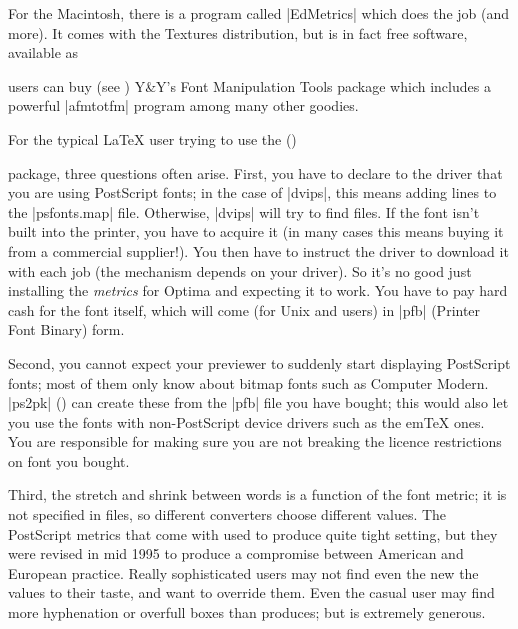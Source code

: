 For the Macintosh, there is a program called \ProgName|EdMetrics| which does
the job (and more).  It comes with the Textures distribution, but is
in fact free software, available as 

\MSDOS{} users can buy
(see )
Y\&Y's Font Manipulation Tools package which includes a powerful
\ProgName|afmtotfm| program among many other goodies.


For the typical \LaTeX{} user trying to use the
\htmlignore
{} ()
\endhtmlignore
\begin{htmlversion}
\end{htmlversion}
package, three questions often arise.
First, you have to declare to the  driver that you are using
PostScript fonts; in the case of \ProgName|dvips|, this means adding
lines to the |psfonts.map| file. Otherwise, \ProgName|dvips| will try
to find  
files. If the font isn't built into the printer, you have to acquire
it (in many cases this means buying it from a commercial supplier!).
You then have to instruct the driver to download it with each job (the
mechanism depends on your driver). So it's no
good just installing the \emph{metrics} for Optima and expecting it to
work. You have to pay hard cash for the font itself, which will come
(for Unix and \MSDOS{} users) in |pfb| (Printer Font Binary) form.

Second, you cannot expect your previewer to suddenly start displaying
PostScript fonts; most of them only know about  bitmap fonts
such as Computer Modern. \ProgName|ps2pk| () can create
these from the |pfb| file you have bought; this would also let you use
the fonts with non-PostScript device drivers such as the em\TeX{}
ones.  You are responsible for making sure you are not breaking the
licence restrictions on font you bought.

Third, the stretch and shrink between words is a function of the
font metric; it is not specified in  files, so different converters
choose different values. The PostScript metrics that come with  
used to produce quite tight setting, but they were revised in mid 1995
to produce a compromise between American and European practice. Really
sophisticated users may not find even the new the values to their taste, and
want to override them. Even the casual user may find  more
hyphenation or overfull boxes than  produces; but 
is extremely generous. 

